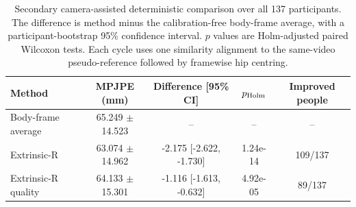 \begin{table}[t]
\caption{Secondary camera-assisted deterministic comparison over all 137 participants.
The difference is method minus the calibration-free body-frame average, with a
participant-bootstrap 95\% confidence interval. $p$ values are Holm-adjusted
paired Wilcoxon tests. Each cycle uses one similarity alignment to the
same-video pseudo-reference followed by framewise hip centring.}
\label{tab:extrinsic-comparison-all137}
\centering
\scriptsize
\setlength{\tabcolsep}{3pt}
\begin{tabular}{lcccc}
\toprule
Method & MPJPE (mm) & Difference [95\% CI] & $p_{\rm Holm}$ & Improved people \\
\midrule
Body-frame average & 65.249 $\pm$ 14.523 & -- & -- & -- \\
Extrinsic-R & 63.074 $\pm$ 14.962 & -2.175 [-2.622, -1.730] & 1.24e-14 & 109/137 \\
Extrinsic-R quality & 64.133 $\pm$ 15.301 & -1.116 [-1.613, -0.632] & 4.92e-05 & 89/137 \\
\bottomrule
\end{tabular}
\end{table}
